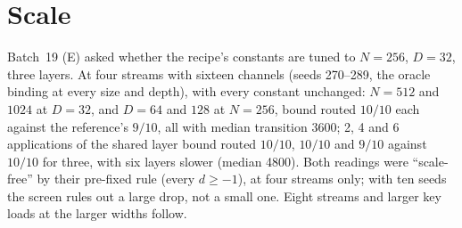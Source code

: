 \documentclass[11pt]{article}
\begin{document}
\section{Scale}
\label{sec:scale}

Batch~19 (E) asked whether the recipe's constants are tuned to $N = 256$, $D = 32$, three layers. At four streams with sixteen channels (seeds 270--289, the oracle binding at every size and depth), with every constant unchanged: $N = 512$ and $1024$ at $D = 32$, and $D = 64$ and $128$ at $N = 256$, bound routed $10/10$ each against the reference's $9/10$, all with median transition 3600; 2, 4 and 6 applications of the shared layer bound routed $10/10$, $10/10$ and $9/10$ against $10/10$ for three, with six layers slower (median 4800). Both readings were ``scale-free'' by their pre-fixed rule (every $d \geq -1$), at four streams only; with ten seeds the screen rules out a large drop, not a small one. Eight streams and larger key loads at the larger widths follow.
\end{document}
